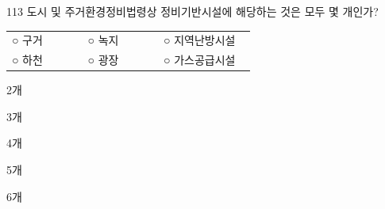 \begin{question}{113}
도시 및 주거환경정비법령상 정비기반시설에 해당하는 것은 모두 몇 개인가?
\begin{framedtext}
\begin{tabular}{@{}p{0.29\linewidth}p{0.29\linewidth}p{0.34\linewidth}@{}}
○ 구거 & ○ 녹지 & ○ 지역난방시설 \\
○ 하천 & ○ 광장 & ○ 가스공급시설
\end{tabular}
\end{framedtext}
\begin{choices}
  \item 2개
  \item 3개
  \item 4개
  \item 5개
  \item 6개
\end{choices}
\end{question}
